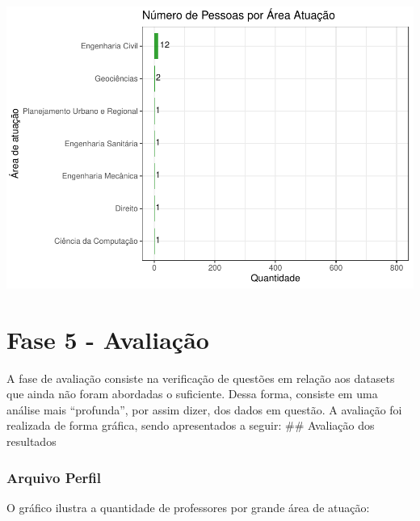 \documentclass[]{article}
\begin{document}
\includegraphics{LuanFreitas.relatorio2_files/figure-latex/unnamed-chunk-64-1.pdf}

\hypertarget{fase-5---avaliauxe7uxe3o}{%
\section{Fase 5 - Avaliação}\label{fase-5---avaliauxe7uxe3o}}

A fase de avaliação consiste na verificação de questões em relação aos
datasets que ainda não foram abordadas o suficiente. Dessa forma,
consiste em uma análise mais ``profunda'', por assim dizer, dos dados em
questão. A avaliação foi realizada de forma gráfica, sendo apresentados
a seguir: \#\# Avaliação dos resultados

\hypertarget{arquivo-perfil-1}{%
\subsubsection{Arquivo Perfil}\label{arquivo-perfil-1}}

O gráfico ilustra a quantidade de professores por grande área de
atuação:
\end{document}
